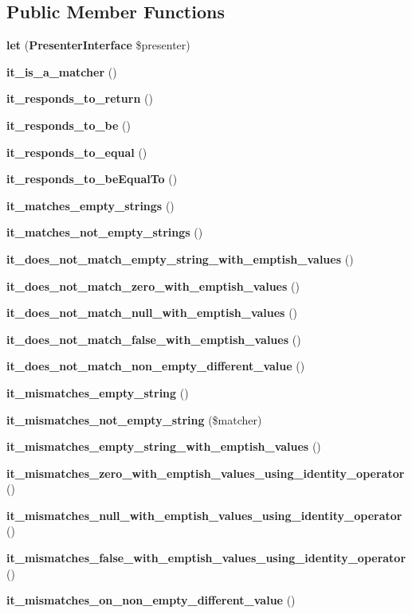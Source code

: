 \subsection*{Public Member Functions}
\begin{DoxyCompactItemize}
\item 
{\bf let} ({\bf Presenter\+Interface} \$presenter)
\item 
{\bf it\+\_\+is\+\_\+a\+\_\+matcher} ()
\item 
{\bf it\+\_\+responds\+\_\+to\+\_\+return} ()
\item 
{\bf it\+\_\+responds\+\_\+to\+\_\+be} ()
\item 
{\bf it\+\_\+responds\+\_\+to\+\_\+equal} ()
\item 
{\bf it\+\_\+responds\+\_\+to\+\_\+be\+Equal\+To} ()
\item 
{\bf it\+\_\+matches\+\_\+empty\+\_\+strings} ()
\item 
{\bf it\+\_\+matches\+\_\+not\+\_\+empty\+\_\+strings} ()
\item 
{\bf it\+\_\+does\+\_\+not\+\_\+match\+\_\+empty\+\_\+string\+\_\+with\+\_\+emptish\+\_\+values} ()
\item 
{\bf it\+\_\+does\+\_\+not\+\_\+match\+\_\+zero\+\_\+with\+\_\+emptish\+\_\+values} ()
\item 
{\bf it\+\_\+does\+\_\+not\+\_\+match\+\_\+null\+\_\+with\+\_\+emptish\+\_\+values} ()
\item 
{\bf it\+\_\+does\+\_\+not\+\_\+match\+\_\+false\+\_\+with\+\_\+emptish\+\_\+values} ()
\item 
{\bf it\+\_\+does\+\_\+not\+\_\+match\+\_\+non\+\_\+empty\+\_\+different\+\_\+value} ()
\item 
{\bf it\+\_\+mismatches\+\_\+empty\+\_\+string} ()
\item 
{\bf it\+\_\+mismatches\+\_\+not\+\_\+empty\+\_\+string} (\$matcher)
\item 
{\bf it\+\_\+mismatches\+\_\+empty\+\_\+string\+\_\+with\+\_\+emptish\+\_\+values} ()
\item 
{\bf it\+\_\+mismatches\+\_\+zero\+\_\+with\+\_\+emptish\+\_\+values\+\_\+using\+\_\+identity\+\_\+operator} ()
\item 
{\bf it\+\_\+mismatches\+\_\+null\+\_\+with\+\_\+emptish\+\_\+values\+\_\+using\+\_\+identity\+\_\+operator} ()
\item 
{\bf it\+\_\+mismatches\+\_\+false\+\_\+with\+\_\+emptish\+\_\+values\+\_\+using\+\_\+identity\+\_\+operator} ()
\item 
{\bf it\+\_\+mismatches\+\_\+on\+\_\+non\+\_\+empty\+\_\+different\+\_\+value} ()
\end{DoxyCompactItemize}
